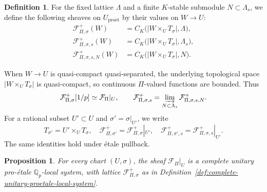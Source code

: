 \documentclass[11pt]{article}
\newtheorem{proposition}[theorem]{Proposition}
\theoremstyle{definition}
\newtheorem{definition}[theorem]{Definition}
\newcommand{\Qp}{\mathbb Q_p}
\newcommand{\cF}{\mathcal F}
\newcommand{\proet}{\mathrm{pro\acute et}}
\begin{document}
\begin{definition}%
\label{def:local-arithmetic-coefficients}
\label{def:general-unitary-local-system}
For the fixed lattice $\Lambda$ and a finite $K$-stable
submodule $N\subset\Lambda_s$, we define the following sheaves on $U_{\proet}$ by their values on $W\to U$:
\begin{align*}
 \cF_{\Pi,\sigma}^+(W)
 &=C_K\bigl(|W\times_UT_\sigma|,\Lambda\bigr),\\
 \cF_{\Pi,\sigma,s}^+(W)
 &=C_K\bigl(|W\times_UT_\sigma|,\Lambda_s\bigr),\\
 \cF_{\Pi,\sigma,s,N}^+(W)
 &=C_K\bigl(|W\times_UT_\sigma|,N\bigr).
\end{align*}
\end{definition}
When \(W\to U\) is quasi-compact quasi-separated, the underlying topological space \(|W\times_UT_\sigma|\) is
quasi-compact, so continuous \(\Pi\)-valued functions are
bounded.  Thus
\begin{equation}\label{eq:local-lattice-rationalization}
 \cF_{\Pi,\sigma}^+[1/p]\simeq\cF_\Pi|_U, \qquad\cF_{\Pi,\sigma,s}^+=\varinjlim_{N\subset\Lambda_s}\cF_{\Pi,\sigma,s, N}^+.
\end{equation}
For a rational subset \(U'\subset U\) and \(\sigma'=\sigma|_{U'}\), we write
\begin{equation}\label{eq:local-coefficient-restriction}
 T_{\sigma'}=U'\times_U T_\sigma,\quad
 \cF_{\Pi,\sigma'}^+=\cF_{\Pi,\sigma}^+|_{U'},\quad
 \cF_{\Pi,\sigma',s}^+=\cF_{\Pi,\sigma,s}^+|_{U'}.
\end{equation}
The same identities hold under \'etale pullback.


\begin{proposition}
\label{lem:local-unitary}
\label{lem:general-unitary-completion}
For every chart \((U,\sigma)\), the sheaf \(\cF_\Pi|_U\) is a complete
unitary pro-\'etale \(\Qp\)-local system, with lattice
\(\cF_{\Pi,\sigma}^+\) as in
Definition~\ref{def:complete-unitary-proetale-local-system}.
\end{proposition}
\end{document}
